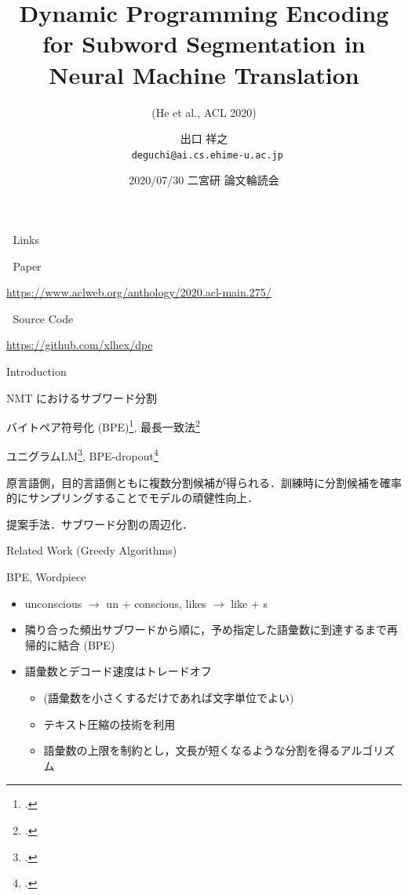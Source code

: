\documentclass[unicode, 12pt, aspectratio=43]{beamer}
\author{出口 祥之 \\ \lower2.0pt\hbox{\materials} \texttt{deguchi@ai.cs.ehime-u.ac.jp}}
\date{2020/07/30 二宮研 論文輪読会}
\title{Dynamic Programming Encoding for Subword Segmentation in Neural Machine Translation}
\subtitle{(He et al., ACL 2020)}
\institute{}
\begin{document}
\maketitle

\begin{frame}[label={sec:org58e037a}]{\hbox{\octicons} Links}
\begin{block}{\hbox{\octicons} Paper}
\begin{block}{\url{https://www.aclweb.org/anthology/2020.acl-main.275/}}
\end{block}
\end{block}
\begin{block}{\hbox{\octicons} Source Code}
\begin{block}{\url{https://github.com/xlhex/dpe}}
\end{block}
\end{block}
\end{frame}

\begin{frame}[label={sec:orgd35ce31}]{Introduction}
\begin{block}{NMT におけるサブワード分割}
\begin{description}
\item[{貪欲法:}] バイトペア符号化 (BPE)\footcite{sennrich-etal-2016-neural}, 最長一致法\footcite{wu-etal-2016-googles}
\item[{確率的アルゴリズム:}] ユニグラムLM\footcite{kudo-2018-subword}, BPE-dropout\footcite{provilkov-etal-2020-bpe}
\item \small 原言語側，目的言語側ともに複数分割候補が得られる．訓練時に分割候補を確率的にサンプリングすることでモデルの頑健性向上． \normalsize
\item[{動的計画法:}] 提案手法．サブワード分割の周辺化．
\end{description}
\end{block}
\end{frame}

\begin{frame}[label={sec:org2e8f372}]{Related Work (Greedy Algorithms)}
\begin{block}{BPE, Wordpiece}
\begin{itemize}
\item unconscious \(\rightarrow\) un + conscious, likes \(\rightarrow\) like + s
\item 隣り合った頻出サブワードから順に，予め指定した語彙数に到達するまで再帰的に結合 (BPE)
\item 語彙数とデコード速度はトレードオフ
\begin{itemize}
\item (語彙数を小さくするだけであれば文字単位でよい)
\item テキスト圧縮の技術を利用
\item 語彙数の上限を制約とし，文長が短くなるような分割を得るアルゴリズム
\end{itemize}
\end{itemize}
\end{block}
\end{frame}
\end{document}
